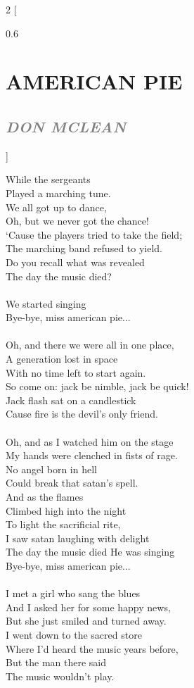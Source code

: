 \documentclass[100pt,a4paper]{report}
\newenvironment{song2}[2]
	{	
    	\begin{multicols*}{2}
		[
			\begin{spacing}{0.6}
				\section*{\LARGE\centering \MakeUppercase{\textbf{{#1}}}}
				\subsection*{\Large\centering \textit{\textcolor{gray}{\MakeUppercase{{#2}}}}}
			\end{spacing}
		]
		\Large
	}
	{
	\end{multicols*}
	\newpage
    }
\begin{document}
\begin{song2}{American Pie}{Don McLean}
While the sergeants\\ 
Played a marching tune.\\
We all got up to dance,\\
Oh, but we never got the chance!\\
`Cause the players tried to take the field;\\
The marching band refused to yield.\\
Do you recall what was revealed\\
The day the music died?\\
\\
We started singing\\
Bye-bye, miss american pie...\\
\\
Oh, and there we were all in one place,\\
A generation lost in space\\
With no time left to start again.\\
So come on: jack be nimble, jack be quick!\\
Jack flash sat on a candlestick\\
Cause fire is the devil's only friend.\\
\\
Oh, and as I watched him on the stage\\
My hands were clenched in fists of rage.\\
No angel born in hell\\
Could break that satan's spell.\\
And as the flames\\
Climbed high into the night\\
To light the sacrificial rite,\\
I saw satan laughing with delight\\
The day the music died
\vfill
\columnbreak
\noindent
He was singing\\
Bye-bye, miss american pie...\\
\\
I met a girl who sang the blues\\
And I asked her for some happy news,\\
But she just smiled and turned away.\\
I went down to the sacred store\\
Where I'd heard the music years before,\\
But the man there said\\
The music wouldn't play.\\

\end{song2}
\end{document}
